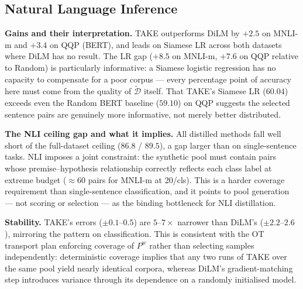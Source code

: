 \subsection{Natural Language Inference} \label{ch5:sec:05-results-nli}
\begin{foldable} %
    \textbf{Gains and their interpretation.}
    TAKE outperforms DiLM by $+2.5$ on MNLI-m and $+3.4$ on QQP (BERT), and leads on Siamese LR across both datasets where DiLM has no result.
    The LR gap ($+8.5$ on MNLI-m, $+7.6$ on QQP relative to Random) is particularly informative: a Siamese logistic regression has no capacity to compensate for a poor corpus --- every percentage point of accuracy here must come from the quality of $\tilde{\mathcal{D}}$ itself.
    That TAKE's Siamese LR ($60.04$) exceeds even the Random BERT baseline ($59.10$) on QQP suggests the selected sentence pairs are genuinely more informative, not merely better distributed.

    \textbf{The NLI ceiling gap and what it implies.}
    All distilled methods fall well short of the full-dataset ceiling ($86.8$ / $89.5$), a gap larger than on single-sentence tasks.
    NLI imposes a joint constraint: the synthetic pool must contain pairs whose premise--hypothesis relationship correctly reflects each class label at extreme budget ($\approx\!60$ pairs for MNLI-m at 20/cls).
    This is a harder coverage requirement than single-sentence classification, and it points to pool generation --- not scoring or selection --- as the binding bottleneck for NLI distillation.

    \textbf{Stability.}
    TAKE's errors ($\pm0.1$--$0.5$) are $5$--$7\times$ narrower than DiLM's ($\pm2.2$--$2.6$), mirroring the pattern on classification.
    This is consistent with the OT transport plan enforcing coverage of $P^w$ rather than selecting samples independently: deterministic coverage implies that any two runs of TAKE over the same pool yield nearly identical corpora, whereas DiLM's gradient-matching step introduces variance through its dependence on a randomly initialised model.
\end{foldable}
